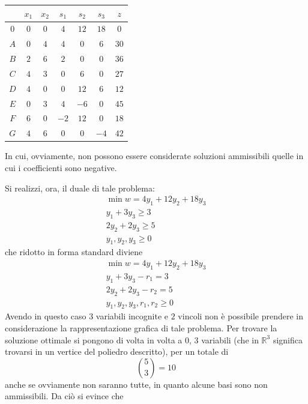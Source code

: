 \documentclass[a4paper]{extarticle}
\renewcommand\arraystretch{}
\begin{document}
\vspace{1em}
\noindent
\begin{table}[H]
    \setlength{\tabcolsep}{8pt}
    \renewcommand{\arraystretch}{1.5}
    \noindent
    \centering
    \begin{tabular}{c|ccccc|c}
         & $x_1$ & $x_2$ & $s_1$ & $s_2$ & $s_3$ & $z$\\
        \hline
        $0$ & $0$ & $0$ & $4$ & $12$ & $18$ & $0$\\
        $A$ & $0$ & $4$ & $4$ & $0$ & $6$ & $30$\\
        $B$ & $2$ & $6$ & $2$ & $0$ & $0$ & $36$\\
        $C$ & $4$ & $3$ & $0$ & $6$ & $0$ & $27$\\
        $D$ & $4$ & $0$ & $0$ & $12$ & $6$ & $12$\\
        $E$ & $0$ & $3$ & $4$ & $-6$ & $0$ & $45$\\
        $F$ & $6$ & $0$ & $-2$ & $12$ & $0$ & $18$\\
        $G$ & $4$ & $6$ & $0$ & $0$ & $-4$ & $42$\\
    \end{tabular}
\end{table}

\vspace{1em}
\noindent
In cui, ovviamente, non possono essere considerate soluzioni ammissibili quelle in cui i coefficienti sono negative.

\vspace{1em}
\noindent
Si realizzi, ora, il duale di tale problema:
\begin{align*}
    \min w = 4 y_1 + 12 y_2 + 18 y_3\\
    y_1 + 3y_3 \geq 3\\
    2y_2 + 2y_3 \geq 5\\
    y_1,y_2,y_3 \geq 0
\end{align*}
che ridotto in forma standard diviene
\begin{align*}
    \min w = 4 y_1 + 12 y_2 + 18 y_3\\
    y_1 + 3y_3 - r_1 = 3\\
    2y_2 + 2y_3 - r_2 = 5\\
    y_1,y_2,y_3,r_1,r_2 \geq 0
\end{align*}
Avendo in questo caso $3$ variabili incognite e $2$ vincoli non è possibile prendere in considerazione la rappresentazione grafica di tale problema. Per trovare la soluzione ottimale si pongono di volta in volta a $0$, $3$ variabili (che in $\mathbb{R}^3$ significa trovarsi in un vertice del poliedro descritto), per un totale di
\[\binom{5}{3} = 10\]
anche se ovviamente non saranno tutte, in quanto alcune basi sono non ammissibili. Da ciò si evince che
\end{document}

